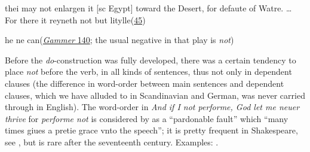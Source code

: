 \z
\z

\ea \label{ex:01-21}
thei may not enlargen it [sc Egypt] toward the Desert, for defaute of Watre. {\dots} For there it reyneth not but litylle\hfill(\href{https://archive.org/details/voiageandtravai02hallgoog/page/n81/mode/2up?q=%22thei+may+not+enlargen%22&view=theater}{45}) %
\z

\ea \label{ex:01-22}
he ne can\hfill(\href{https://archive.org/details/gamFmergurtonsne00stiluoft/page/46/mode/2up?q=%22Because+for+lack+of+light+discern+him+he+ne+can.%22}{\textit{Gammer} 140}; the usual negative in that play is \textit{not})
\z

Before the \textit{do}-construction was fully developed, there was a certain tendency to place \textit{not} before the verb, in all kinds of sentences, thus not only in dependent clauses (the difference in word-order between main sentences and dependent clauses, which we have alluded to in Scandinavian and German, was never carried through in English). The word-order in \textit{And if I not performe, God let me neuer thrive} for \textit{performe not} is considered by \citet[\href{https://quod.lib.umich.edu/e/eebo2/A68619.0001.001/1:6?rgn=div1;subview=detail;type=simple;view=fulltext;q1=if+I+not+performe}{262}]{puttenham1589arte} as a ``pardonable fault'' which ``many times giues a pretie grace vnto the speech''; it is pretty frequent in Shakespeare, see \citet[\href{https://www.perseus.tufts.edu/hopper/text?doc=Perseus\%3Atext\%3A1999.03.0079\%3Aalphabetic+letter\%3DN\%3Aentry+group\%3D8\%3Aentry\%3DNot}{779}]{schmidt1886}, but is rare after the seventeenth %
century. Examples: .

